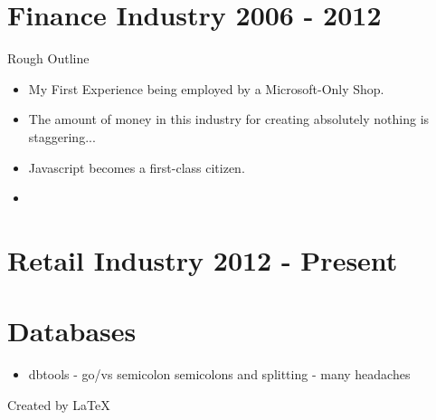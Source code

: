 \documentclass[12pt]{report}
\begin{document}
\section{Finance Industry 2006 - 2012}
Rough Outline
\begin{itemize}
\item My First Experience being employed by a Microsoft-Only Shop.
\item The amount of money in this industry for creating absolutely
  nothing is staggering...
\item Javascript becomes a first-class citizen.
\item 

\end{itemize}

\section{}
\section{Retail Industry 2012 - Present}

\section{Databases}
\begin{itemize}
\item dbtools - go/vs semicolon semicolons and splitting - many headaches  
\end{itemize}

Created by \LaTeX\	
\end{document}
